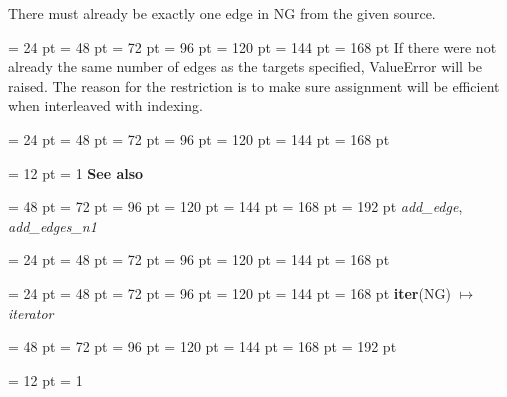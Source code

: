 {{{{    There must already be exactly one edge in NG from the given source.\par}
\par}
\par}
{\par \noindent  \leftskip = 24 pt  \leftmargini = 48 pt  \leftmarginii = 72 pt  \leftmarginiii = 96 pt  \leftmarginiv = 120 pt  \leftmarginv = 144 pt  \leftmarginvi = 168 pt 
If there were not already the same number of edges as the targets specified,
ValueError will be raised. The reason for the restriction is to make sure
assignment will be efficient when interleaved with indexing.\par}
{\par \noindent  \leftskip = 24 pt  \leftmargini = 48 pt  \leftmarginii = 72 pt  \leftmarginiii = 96 pt  \leftmarginiv = 120 pt  \leftmarginv = 144 pt  \leftmarginvi = 168 pt {\par \noindent
{\par \pagebreak[3.200000] \noindent \hangindent = 12 pt \hangafter = 1 
{\bf {\large {\bf See also\/}}\/}\par}
{\par \noindent  \leftskip = 48 pt  \leftmargini = 72 pt  \leftmarginii = 96 pt  \leftmarginiii = 120 pt  \leftmarginiv = 144 pt  \leftmarginv = 168 pt  \leftmarginvi = 192 pt   {\em add{\_}edge\/},  {\em add{\_}edges{\_}n1\/}\par}
\par}
\par}
{\par \noindent  \leftskip = 24 pt  \leftmargini = 48 pt  \leftmarginii = 72 pt  \leftmarginiii = 96 pt  \leftmarginiv = 120 pt  \leftmarginv = 144 pt  \leftmarginvi = 168 pt {\par \noindent
\par}
\par}
{\par \noindent  \leftskip = 24 pt  \leftmargini = 48 pt  \leftmarginii = 72 pt  \leftmarginiii = 96 pt  \leftmarginiv = 120 pt  \leftmarginv = 144 pt  \leftmarginvi = 168 pt {\large {\bf iter\/}}(NG) \(\mapsto \)  {\em iterator\/}{\par \noindent
{\par \noindent  \leftskip = 48 pt  \leftmargini = 72 pt  \leftmarginii = 96 pt  \leftmarginiii = 120 pt  \leftmarginiv = 144 pt  \leftmarginv = 168 pt  \leftmarginvi = 192 pt {\par \noindent
{\par \pagebreak[3.100000] \noindent \hangindent = 12 pt \hangafter = 1 
}}}}}}
